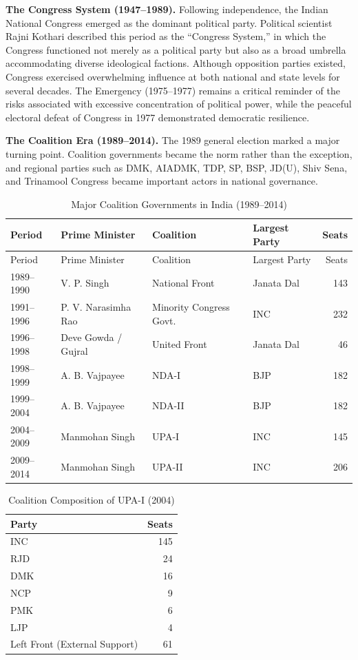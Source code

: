 \documentclass[11pt]{article}
\begin{document}
\textbf{The Congress System (1947--1989).} Following independence, the Indian National Congress emerged as the dominant political party. Political scientist Rajni Kothari described this period as the ``Congress System,'' in which the Congress functioned not merely as a political party but also as a broad umbrella accommodating diverse ideological factions. Although opposition parties existed, Congress exercised overwhelming influence at both national and state levels for several decades. The Emergency (1975--1977) remains a critical reminder of the risks associated with excessive concentration of political power, while the peaceful electoral defeat of Congress in 1977 demonstrated democratic resilience.

\textbf{The Coalition Era (1989--2014).} The 1989 general election marked a major turning point. Coalition governments became the norm rather than the exception, and regional parties such as DMK, AIADMK, TDP, SP, BSP, JD(U), Shiv Sena, and Trinamool Congress became important actors in national governance.

\begin{longtable}{llllr}
\caption{Major Coalition Governments in India (1989--2014)}\\
\toprule
Period & Prime Minister & Coalition & Largest Party & Seats\\
\midrule
\endfirsthead
\toprule
Period & Prime Minister & Coalition & Largest Party & Seats\\
\midrule
\endhead
1989--1990 & V. P. Singh & National Front & Janata Dal & 143\\
1991--1996 & P. V. Narasimha Rao & Minority Congress Govt. & INC & 232\\
1996--1998 & Deve Gowda / Gujral & United Front & Janata Dal & 46\\
1998--1999 & A. B. Vajpayee & NDA-I & BJP & 182\\
1999--2004 & A. B. Vajpayee & NDA-II & BJP & 182\\
2004--2009 & Manmohan Singh & UPA-I & INC & 145\\
2009--2014 & Manmohan Singh & UPA-II & INC & 206\\
\bottomrule
\end{longtable}

\begin{table}[h]
\centering
\caption{Coalition Composition of UPA-I (2004)}
\begin{tabular}{lr}
\toprule
Party & Seats\\
\midrule
INC & 145\\
RJD & 24\\
DMK & 16\\
NCP & 9\\
PMK & 6\\
LJP & 4\\
Left Front (External Support) & 61\\
\bottomrule
\end{tabular}
\end{table}
\end{document}

